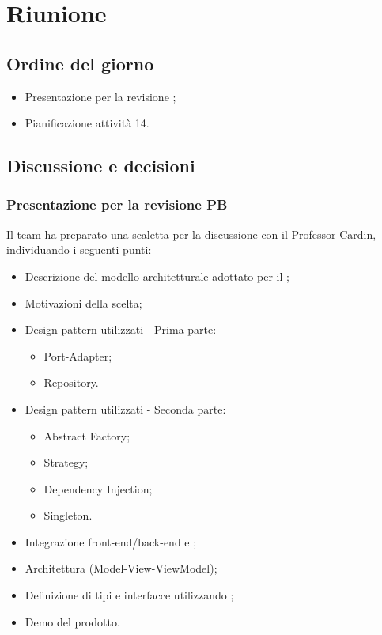 \section{Riunione}
\subsection{Ordine del giorno}
\begin{itemize}
	\item Presentazione per la revisione ;
	\item Pianificazione attività  14.
\end{itemize}

\subsection{Discussione e decisioni}
\subsubsection{Presentazione per la revisione PB}
\par Il team ha preparato una scaletta per la discussione con il Professor Cardin, individuando i seguenti punti:
\begin{itemize}
	\item Descrizione del modello architetturale adottato per il ;
	\item Motivazioni della scelta;
	\item Design pattern utilizzati - Prima parte:
	\begin{itemize}
		\item Port-Adapter;
		\item Repository.
	\end{itemize}
	\item Design pattern utilizzati - Seconda parte:
	\begin{itemize}
		\item Abstract Factory;
		\item Strategy;
		\item Dependency Injection;
		\item Singleton.
	\end{itemize}
	\item Integrazione front-end/back-end e ;
	\item Architettura  (Model-View-ViewModel);
	\item Definizione di tipi e interfacce utilizzando ;
	\item Demo del prodotto.
\end{itemize}

